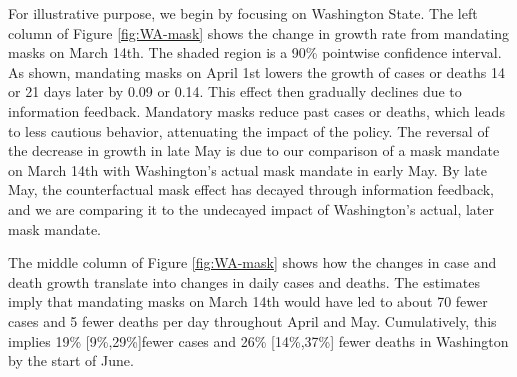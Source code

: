 \documentclass[11pt,reqno,letter]{amsart}
\theoremstyle{definition}
\begin{document}
For illustrative purpose, we begin by focusing on Washington State.
The left column of Figure \ref{fig:WA-mask} shows the change in
growth rate from mandating masks on March 14th. The shaded region is a
90\% pointwise confidence interval. As shown, mandating masks on April
1st lowers the growth of cases or deaths 14 or 21 days later by 0.09 or
0.14. This effect then gradually declines due to information
feedback. Mandatory masks reduce past cases or deaths, which leads to
less cautious behavior, attenuating the impact of the policy. The
reversal of the decrease in growth in late May is due to our
comparison of a mask mandate on March 14th with Washington's actual
mask mandate in early May. By late May, the counterfactual mask
effect has decayed through information feedback, and we are comparing
it to the undecayed impact of Washington's actual, later mask mandate.

The middle column of Figure \ref{fig:WA-mask} shows how the changes in
case and death growth translate into changes in daily cases and
deaths. The estimates imply that mandating masks on March 14th would
have led to about 70 fewer cases and 5 fewer deaths per day throughout
April and May. Cumulatively, this implies 19\% [9\%,29\%]fewer cases and 26\%
[14\%,37\%] fewer deaths in Washington by the start of June.
\end{document}
